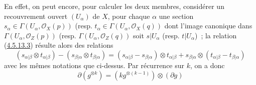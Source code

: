 En effet, on peut encore, pour calculer les deux membres, considérer un
recouvrement ouvert $(U_\alpha)$ de $X$, pour chaque $\alpha$ une section
$s_\alpha\in\Gamma(U_\alpha,\mathcal{O}_X(p))$ (resp.
$t_\alpha\in\Gamma(U_\alpha,\mathcal{O}_X(q))$ dont l'image canonique dans
$\Gamma(U_\alpha,\mathcal{O}_Z(p))$ (resp.
$\Gamma(U_\alpha,\mathcal{O}_Z(q))$ soit $s|U_\alpha$ (resp.
$t|U_\alpha$)~; la relation
(\hyperref[II.4.5.13.3-fr]{4.5.13.3}) résulte alors des relations
\[
  (s_{\alpha|\beta}\otimes t_{\alpha|\beta})
  -(s_{\beta|\alpha}\otimes t_{\beta|\alpha})
  =(s_{\alpha|\beta}-s_{\beta|\alpha})\otimes t_{\alpha|\beta}
  +s_{\beta|\alpha}\otimes(t_{\alpha|\beta}-t_{\beta|\alpha})
\]
avec les mêmes notations que ci-dessus. Par récurrence sur $k$, on a donc
\begin{equation}
\label{II.4.5.13.4-fr}
  \partial(g^{\otimes k})=(kg^{\otimes(k-1)})\otimes(\partial g)
\tag{4.5.13.4}
\end{equation}

